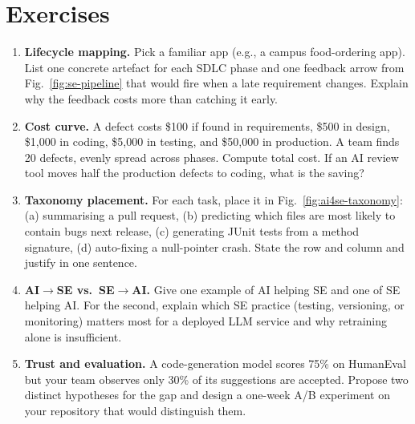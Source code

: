 \section{Exercises}
\label{sec:ch01-exercises}
\begin{enumerate}[label=E1.\arabic*, leftmargin=*, itemsep=0.7em]
    \item \textbf{Lifecycle mapping.} Pick a familiar app (e.g., a campus food-ordering app). List one concrete artefact for each SDLC phase and one feedback arrow from Fig.~\ref{fig:se-pipeline} that would fire when a late requirement changes. Explain why the feedback costs more than catching it early.
    \item \textbf{Cost curve.} A defect costs \$100 if found in requirements, \$500 in design, \$1{,}000 in coding, \$5{,}000 in testing, and \$50{,}000 in production. A team finds 20 defects, evenly spread across phases. Compute total cost. If an AI review tool moves half the production defects to coding, what is the saving?
    \item \textbf{Taxonomy placement.} For each task, place it in Fig.~\ref{fig:ai4se-taxonomy}: (a) summarising a pull request, (b) predicting which files are most likely to contain bugs next release, (c) generating JUnit tests from a method signature, (d) auto-fixing a null-pointer crash. State the row and column and justify in one sentence.
    \item \textbf{AI$\to$SE vs.\ SE$\to$AI.} Give one example of AI helping SE and one of SE helping AI. For the second, explain which SE practice (testing, versioning, or monitoring) matters most for a deployed LLM service and why retraining alone is insufficient.
    \item \textbf{Trust and evaluation.} A code-generation model scores 75\% on HumanEval but your team observes only 30\% of its suggestions are accepted. Propose two distinct hypotheses for the gap and design a one-week A/B experiment on your repository that would distinguish them.
\end{enumerate}
